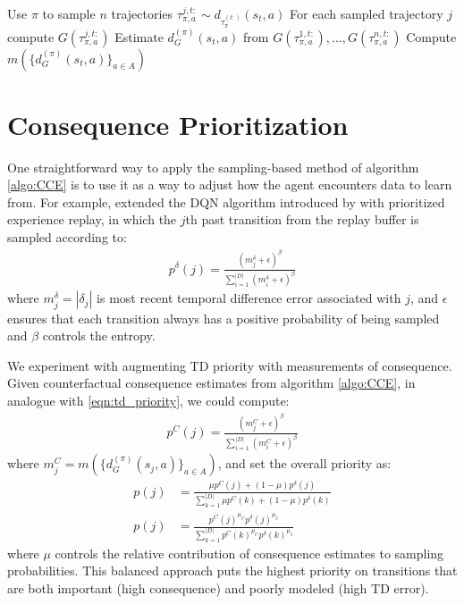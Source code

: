 \documentclass[conference]{IEEEtran}
\begin{document}
\begin{algorithm}[H]
\caption{Counterfactual Consequence Estimation}\label{algo:CCE}
\begin{algorithmic}[1]
\State Use $\pi$ to sample $n$ trajectories $\tau_{\pi,a}^{j,t:}\sim d_{\tau_{\pi}^{(t:)}}(s_t,a)$
\State For each sampled trajectory $j$ compute $G(\tau_{\pi,a}^{j,t:})$
\State Estimate $d_G^{(\pi)}(s_t,a)$ from $G(\tau_{\pi,a}^{1,t:}),\hdots,G(\tau_{\pi,a}^{n,t:})$
\EndFor
\State Compute $m(\{d_G^{(\pi)}(s_t,a)\}_{a\in A})$
\end{algorithmic}
\end{algorithm}

\section{Consequence Prioritization}
\noindent One straightforward way to apply the sampling-based method of algorithm \ref{algo:CCE} is to use it as a way to adjust how the agent encounters data to learn from.  For example, \cite{schaul2016prioritizedexperiencereplay} extended the DQN algorithm introduced by \cite{mnih2013playingatarideepreinforcement} with prioritized experience replay, in which the $j$th past transition from the replay buffer is sampled according to:
\begin{align}
    p^\delta(j) = \frac{(m^\delta_j+\epsilon)^\beta}{\sum_{i=1}^{|D|}(m^\delta_i + \epsilon)^\beta}\label{eqn:td_priority}
\end{align}
where $m^\delta_j = |\delta_j|$ is most recent temporal difference error associated with $j$, and $\epsilon$ ensures that each transition always has a positive probability of being sampled and $\beta$ controls the entropy.

We experiment with augmenting TD priority with measurements of consequence. Given counterfactual consequence estimates from algorithm \ref{algo:CCE}, in analogue with \ref{eqn:td_priority}, we could compute:
\begin{align}
    p^C(j) = \frac{(m^C_j+\epsilon)^\beta}{\sum_{i=1}^{|D|}(m^C_i + \epsilon)^\beta}\label{eqn:cce_priority}
\end{align}
where $m_j^C = m(\{d^{(\pi)}_G(s_j,a)\}_{a\in A})$, and set the overall priority as:
\begin{align}
    p(j) &= \frac{\mu p^C(j) + (1-\mu)p^{\delta}(j)}{\sum_{k=1}^{|D|}
    \mu p^C(k) + (1-\mu)p^{\delta}(k)}\label{eqn:balance_priority}\\
    p(j) &= \frac{p^C(j)^{\mu_C}p^{\delta}(j)^{\mu_{\delta}}}{\sum_{k=1}^{|D|}
    p^C(k)^{\mu_C}p^{\delta}(k)^{\mu_\delta}}\label{eqn:balance_priority}
\end{align}
where $\mu$ controls the relative contribution of consequence estimates to sampling probabilities. This balanced approach puts the highest priority on transitions that are both important (high consequence) and poorly modeled (high TD error).
\end{document}

